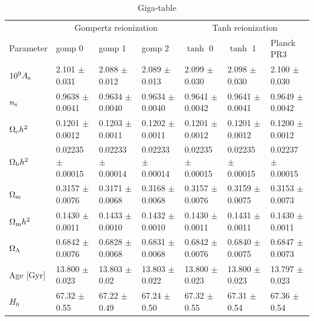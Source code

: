 \begin{landscape}
\begin{table}
\centering
\caption{Giga-table}
\begin{tabular}{l l l l l l l}
\toprule
 & \multicolumn{3}{c}{Gompertz reionization} & \multicolumn{3}{c}{Tanh reionization} \\
Parameter & gomp 0 & gomp 1 & gomp 2 & $\tanh$ 0 & $\tanh$ 1 & Planck PR3\cite{Planck2020a} \\
\midrule
$10^{9} A_\mathrm{s}$ & \cellcolor[gray]{0.9} 2.101 $\pm$ 0.031 & 2.088 $\pm$ 0.012 & 2.089 $\pm$ 0.013 & \cellcolor[gray]{0.9} 2.099 $\pm$ 0.030 & 2.098 $\pm$ 0.030 & \cellcolor[gray]{0.9} 2.100 $\pm$ 0.030 \\
$n_\mathrm{s}$ &\cellcolor[gray]{0.9} 0.9638 $\pm$ 0.0041 & \cellcolor[gray]{0.9} 0.9634 $\pm$ 0.0040 & \cellcolor[gray]{0.9} 0.9634 $\pm$ 0.0040 & \cellcolor[gray]{0.9} 0.9641 $\pm$ 0.0042 & \cellcolor[gray]{0.9} 0.9641 $\pm$ 0.0041 & \cellcolor[gray]{0.9} 0.9649 $\pm$ 0.0042 \\
$\Omega_\mathrm{c} h^2$ &\cellcolor[gray]{0.9} 0.1201 $\pm$ 0.0012 & \cellcolor[gray]{0.9} 0.1203 $\pm$ 0.0011 & \cellcolor[gray]{0.9} 0.1202 $\pm$ 0.0011 & \cellcolor[gray]{0.9} 0.1201 $\pm$ 0.0012 & \cellcolor[gray]{0.9} 0.1201 $\pm$ 0.0012 & \cellcolor[gray]{0.9} 0.1200 $\pm$ 0.0012 \\
$\Omega_\mathrm{b} h^2$ & \cellcolor[gray]{0.9} 0.02235 $\pm$  0.00015 & \cellcolor[gray]{0.9} 0.02233 $\pm$ 0.00014 & \cellcolor[gray]{0.9} 0.02233 $\pm$ 0.00014 &  \cellcolor[gray]{0.9} 0.02235 $\pm$ 0.00015 & \cellcolor[gray]{0.9} 0.02235 $\pm$ 0.00015 & \cellcolor[gray]{0.9} 0.02237 $\pm$ 0.00015 \\
$\Omega_\mathrm{m}$ & 0.3157 $\pm$ 0.0076 & 0.3171 $\pm$ 0.0068 & 0.3168 $\pm$ 0.0068 & 0.3157 $\pm$ 0.0076 & 0.3159 $\pm$ 0.0075 & 0.3153 $\pm$ 0.0073 \\
$\Omega_\mathrm{m} h^2$ & 0.1430 $\pm$ 0.0011 & 0.1433 $\pm$ 0.0010 & 0.1432 $\pm$ 0.0010 & 0.1430 $\pm$ 0.0011 & 0.1431 $\pm$ 0.0011 & 0.1430 $\pm$ 0.0011 \\
$\Omega_\Lambda$ & 0.6842 $\pm$ 0.0076 & 0.6828 $\pm$ 0.0068 & 0.6831 $\pm$ 0.0068 & 0.6842 $\pm$ 0.0076 & 0.6840 $\pm$ 0.0075 & 0.6847 $\pm$ 0.0073 \\
Age [Gyr] & 13.800 $\pm$ 0.023 & 13.803 $\pm$ 0.02 & 13.803 $\pm$ 0.022 & 13.800 $\pm$ 0.023 & 13.800 $\pm$ 0.023 & 13.797 $\pm$ 0.023 \\
$H_0$ & 67.32 $\pm$ 0.55 & \cellcolor[gray]{0.9} 67.22 $\pm$ 0.49 & \cellcolor[gray]{0.9} 67.24 $\pm$ 0.50 & 67.32 $\pm$ 0.55 & \cellcolor[gray]{0.9} 67.31 $\pm$ 0.54 & 67.36 $\pm$ 0.54 \\

\end{tabular}
\end{table}
\end{landscape}
